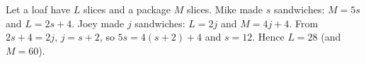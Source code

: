 Let a loaf have $L$ slices and a package $M$ slices. Mike made $s$ sandwiches: $M=5s$ and $L=2s+4$. Joey made $j$ sandwiches: $L=2j$ and $M=4j+4$. From $2s+4=2j$, $j=s+2$, so $5s=4(s+2)+4$ and $s=12$. Hence $L=\boxed{28}$ (and $M=60$).
